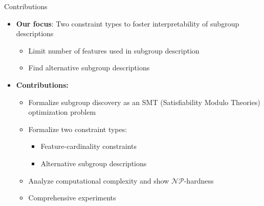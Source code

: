 \documentclass[en, navbaroff, handout]{sdqbeamer}
\begin{document}
\begin{frame}[t]{Contributions}
	\begin{itemize}
		\item \textbf{Our focus}: Two constraint types to foster interpretability of subgroup descriptions
		\begin{itemize}
			\item Limit number of features used in subgroup description
			\item Find alternative subgroup descriptions
		\end{itemize}
		\pause
		\vspace{\baselineskip}
		\item \textbf{Contributions:}
		\begin{itemize}
			\item Formalize subgroup discovery as an SMT (Satisfiability Modulo Theories) optimization problem
			\item Formalize two constraint types:
			\begin{itemize}
				\item Feature-cardinality constraints
				\item Alternative subgroup descriptions
			\end{itemize}
			\item Analyze computational complexity and show $\mathcal{NP}$-hardness
			\item Comprehensive experiments
		\end{itemize}
	\end{itemize}
\end{frame}
\end{document}
